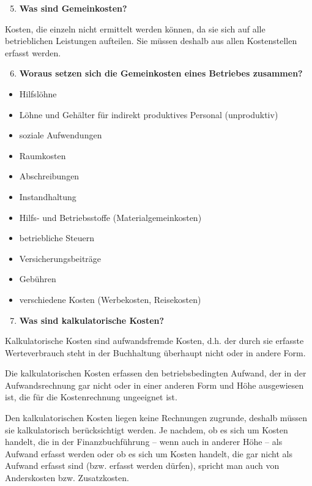 \begin{enumerate}
\setcounter{enumi}{4}
\item
  \textbf{Was sind Gemeinkosten?}
\end{enumerate}

Kosten, die einzeln nicht ermittelt werden können, da sie sich auf alle
betrieblichen Leistungen aufteilen. Sie müssen deshalb aus allen
Kostenstellen erfasst werden.

\begin{enumerate}
\setcounter{enumi}{5}
\item
  \textbf{Woraus setzen sich die Gemeinkosten eines Betriebes zusammen?}
\end{enumerate}

\begin{itemize}
\item
  Hilfslöhne
\item
  Löhne und Gehälter für indirekt produktives Personal (unproduktiv)
\item
  soziale Aufwendungen
\item
  Raumkosten
\item
  Abschreibungen
\item
  Instandhaltung
\item
  Hilfs- und Betriebsstoffe (Materialgemeinkosten)
\item
  betriebliche Steuern
\item
  Versicherungsbeiträge
\item
  Gebühren
\item
  verschiedene Kosten (Werbekosten, Reisekosten)
\end{itemize}

\begin{enumerate}
\setcounter{enumi}{6}
\item
  \textbf{Was sind kalkulatorische Kosten?}
\end{enumerate}

Kalkulatorische Kosten sind aufwandsfremde Kosten, d.h. der durch sie
erfasste Werteverbrauch steht in der Buchhaltung überhaupt nicht oder in
andere Form.

Die kalkulatorischen Kosten erfassen den betriebsbedingten Aufwand, der
in der Aufwandsrechnung gar nicht oder in einer anderen Form und Höhe
ausgewiesen ist, die für die Kostenrechnung ungeeignet ist.

Den kalkulatorischen Kosten liegen keine Rechnungen zugrunde, deshalb
müssen sie kalkulatorisch berücksichtigt werden. Je nachdem, ob es sich
um Kosten handelt, die in der Finanzbuchführung -- wenn auch in anderer
Höhe -- als Aufwand erfasst werden oder ob es sich um Kosten handelt,
die gar nicht als Aufwand erfasst sind (bzw. erfasst werden dürfen),
spricht man auch von Anderskosten bzw. Zusatzkosten.

